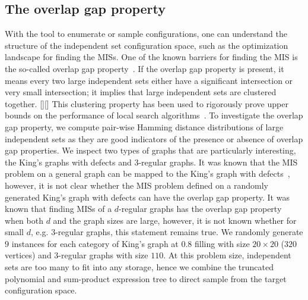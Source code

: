 \documentclass[onefignum, onetabnum]{siamart190516}
\newcommand{\<}{\langle}
\renewcommand{\>}{\rangle}
\newcommand{\blue}[1]{[{\bf  \color{blue}{JG: #1}}]}
\newcommand{\purple}[1]{[{\bf  \color{purple}{MC: #1}}]}
\begin{document}
\subsection{The overlap gap property\label{sec:overlap-gap}}
With the tool to enumerate or sample configurations, one can understand the structure of the independent set configuration space, such as the optimization landscape for finding the MISs.
One of the known barriers for finding the MIS is the so-called overlap gap property~\cite{Gamarnik2013, Gamarnik2019}.
If the overlap gap property is present, it means every two large independent sets either have a significant intersection or very small intersection;
it implies that large independent sets are clustered together. \purple{Do you want me to write a more formal definition as well or do you think it's not necessary?}\blue{Explaining the concept overlap gap property well seems to be impossible in a this paper (you need at least some plots).}
This clustering property has been used to rigorously prove upper bounds on the performance of local search algorithms~\cite{Gamarnik2013, Gamarnik2019}.
To investigate the overlap gap property, we compute pair-wise Hamming distance distributions of large independent sets as they are good indicators of the presence or absence of overlap gap properties.
We inspect two types of graphs that are particularly interesting, the King's graphs with defects and $3$-regular graphs. %
It was known that the MIS problem on a general graph can be mapped to the King's graph with defects~\cite{Ebadi2022}, however, it is not clear whether the MIS problem defined on a randomly generated King's graph with defects can have the overlap gap property.
It was known that finding MISs of a $d$-regular graphs has the overlap gap property~\cite{Rahman2017,Gamarnik2021} when both $d$ and the graph sizes are large, however, it is not known whether for small $d$, e.g. $3$-regular graphs, this statement remains true.
We randomly generate $9$ instances for each category of King's graph at $0.8$ filling with size $20\times 20$ ($320$ vertices) and $3$-regular graphs with size $110$.
At this problem size, independent sets are too many to fit into any storage, hence we combine the truncated polynomial and sum-product expression tree to direct sample from the target configuration space.
\end{document}
